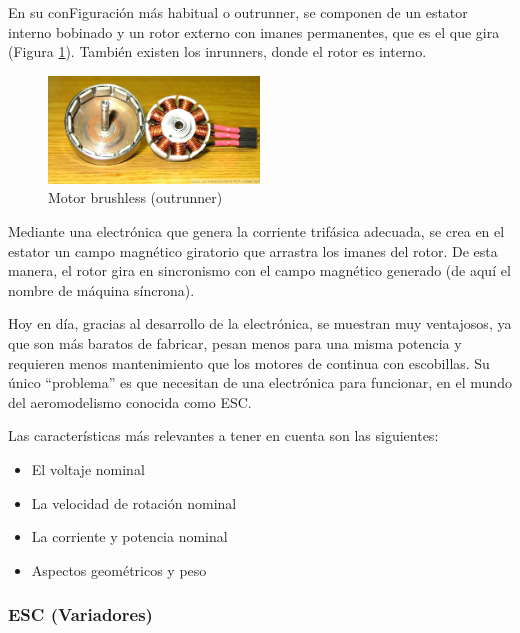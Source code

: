 \documentclass[12pt,twoside]{article}
\begin{document}
\begin{itemize}
	En su conFiguración más habitual o outrunner, se componen de un estator interno 	bobinado y un rotor externo con imanes permanentes, que es el que gira (Figura \ref{fig:motor_brushless}). También 	existen los inrunners, donde el rotor es interno.

			\begin{figure}
			\centering
			\includegraphics[width=0.5\textwidth]{Imatges/Funcionament/motor_brushless.png}
			\caption{Motor brushless (outrunner)}
			\label{fig:motor_brushless}
		\end{figure}
	
Mediante una electrónica que genera la corriente trifásica adecuada, se crea en el 	estator un campo magnético giratorio que arrastra los imanes del rotor. De esta 	manera, el rotor gira en sincronismo con el campo magnético generado (de aquí el 	nombre de máquina síncrona).

	Hoy en día, gracias al desarrollo de la electrónica, se muestran muy ventajosos, ya que 	son más baratos de fabricar, pesan menos para una misma potencia y requieren 	menos mantenimiento que los 	motores de continua con escobillas. Su único 	“problema” es que necesitan de una electrónica para funcionar, en el mundo del 	aeromodelismo conocida como ESC.
	
	Las características más relevantes a tener en cuenta son las siguientes:
		\begin{itemize}

			\item El voltaje nominal
			\item La velocidad de rotación nominal
			\item La corriente y potencia nominal
			\item Aspectos geométricos y peso
		\end{itemize}
	

		\end{itemize}
		
			\subsubsection{ESC (Variadores)}\label{subsubsec:ESC}
			
\end{document}
